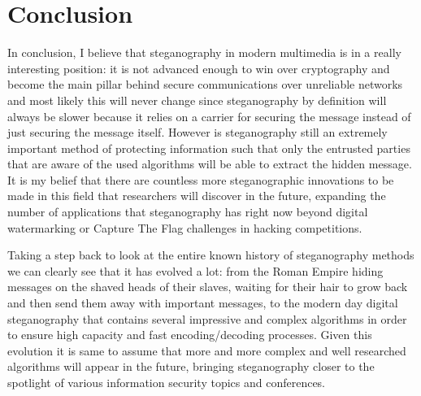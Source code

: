 \documentclass[notitlepage]{report}
\begin{document}
\tableofcontents{}







\clearpage
\chapter{Conclusion}
In conclusion, I believe that steganography in modern multimedia is in a really interesting position: it is not advanced enough to win over cryptography and become the main pillar behind secure communications over unreliable networks and most likely this will never change since steganography by definition will always be slower because it relies on a carrier for securing the message instead of just securing the message itself. However is steganography still an extremely important method of protecting information such that only the entrusted parties that are aware of the used algorithms will be able to extract the hidden message. It is my belief that there are countless more steganographic innovations to be made in this field that researchers will discover in the future, expanding the number of applications that steganography has right now beyond digital watermarking or Capture The Flag challenges in hacking competitions. 

Taking a step back to look at the entire known history of steganography methods we can clearly see that it has evolved a lot: from the Roman Empire hiding messages on the shaved heads of their slaves, waiting for their hair to grow back and then send them away with important messages, to the modern day digital steganography that contains several impressive and complex algorithms in order to ensure high capacity and fast encoding/decoding processes. Given this evolution it is same to assume that more and more complex and well researched algorithms will appear in the future, bringing steganography closer to the spotlight of various information security topics and conferences.



\restoregeometry
\end{document}
